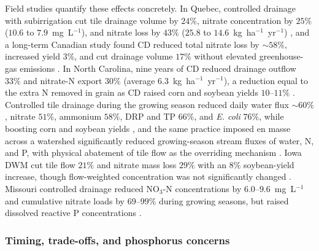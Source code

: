 Field studies quantify these effects concretely. In Quebec, controlled
drainage with subirrigation cut tile drainage volume by $24\%$, nitrate
concentration by $25\%$ ($10.6$ to $7.9$~mg~L$^{-1}$), and nitrate loss by
$43\%$ ($25.8$ to $14.6$~kg~ha$^{-1}$~yr$^{-1}$) \parencite{Ng2000}, and a
long-term Canadian study found CD reduced total nitrate loss by $\sim58\%$,
increased yield $3\%$, and cut drainage volume $17\%$ without elevated
greenhouse-gas emissions \parencite{Madramootoo2024}. In North Carolina,
nine years of CD reduced drainage outflow $33\%$ and nitrate-N export
$30\%$ (average $6.3$~kg~ha$^{-1}$~yr$^{-1}$), a reduction equal to the
extra N removed in grain as CD raised corn and soybean yields $10$--$11\%$
\parencite{Poole2018}. Controlled tile drainage during the growing season
reduced daily water flux $\sim60\%$, nitrate $51\%$, ammonium $58\%$, DRP
and TP $66\%$, and \emph{E. coli} $76\%$, while boosting corn and soybean
yields \parencite{Sunohara2016}, and the same practice imposed en masse
across a watershed significantly reduced growing-season stream fluxes of
water, N, and P, with physical abatement of tile flow as the overriding
mechanism \parencite{Sunohara2015}. Iowa DWM cut tile flow $21\%$ and
nitrate mass loss $29\%$ with an $8\%$ soybean-yield increase, though
flow-weighted concentration was not significantly changed
\parencite{Jaynes2012}. Missouri controlled drainage reduced NO$_3$-N
concentrations by $6.0$--$9.6$~mg~L$^{-1}$ and cumulative nitrate loads by
$69$--$99\%$ during growing seasons, but raised dissolved reactive P
concentrations \parencite{Nash2020}.

\subsubsection{Timing, trade-offs, and phosphorus concerns}

